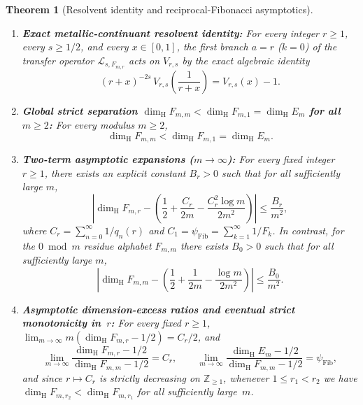 \documentclass[11pt]{article}
\newtheorem{theorem}{Theorem}
\theoremstyle{definition}
\theoremstyle{remark}
\newcommand{\Z}{\mathbb{Z}}
\newcommand{\dimH}{\dim_{\mathrm{H}}}
\begin{document}
\begin{theorem}[Resolvent identity and reciprocal-Fibonacci asymptotics]\label{thm:residues-asymptotic}
\begin{enumerate}[label=(\roman*),leftmargin=2.2em]
\item \textbf{Exact metallic-continuant resolvent identity:}
For every integer $r\ge1$, every $s\ge1/2$, and every $x\in[0,1]$, the first
branch $a=r$ ($k=0$) of the transfer operator $\mathcal L_{s,F_{m,r}}$ acts on
$V_{r,s}$ by the exact algebraic identity
\begin{equation}\label{eq:resolvent-branch}
(r+x)^{-2s}\,V_{r,s}\!\left(\frac{1}{r+x}\right)
=V_{r,s}(x)-1.
\end{equation}
\item \textbf{Global strict separation $\dimH F_{m,m}<\dimH F_{m,1}=\dimH E_m$ for all $m\ge2$:}
For every modulus $m\ge2$,
\begin{equation}\label{eq:global-strict-sep}
\dimH F_{m,m}
<\dimH F_{m,1}
=\dimH E_m.
\end{equation}
\item \textbf{Two-term asymptotic expansions ($m\to\infty$):}
For every fixed integer $r\ge1$, there exists an explicit constant $B_r>0$ such
that for all sufficiently large $m$,
\begin{equation}\label{eq:dimH-Fmr-two-term}
\left|\dimH F_{m,r}-\left(\frac12+\frac{C_r}{2m}-\frac{C_r^2\log m}{2m^2}\right)\right|
\le\frac{B_r}{m^2},
\end{equation}
where $C_r=\sum_{n=0}^\infty 1/q_n(r)$ and $C_1=\psi_{\mathrm{Fib}}=\sum_{k=1}^\infty 1/F_k$.
In contrast, for the $0\bmod m$ residue alphabet $F_{m,m}$ there exists $B_0>0$
such that for all sufficiently large $m$,
\begin{equation}\label{eq:dimH-Fmm-two-term}
\left|\dimH F_{m,m}-\left(\frac12+\frac{1}{2m}-\frac{\log m}{2m^2}\right)\right|
\le\frac{B_0}{m^2}.
\end{equation}
\item \textbf{Asymptotic dimension-excess ratios and eventual strict monotonicity in~$r$:}
For every fixed $r\ge1$, $\lim_{m\to\infty}m(\dimH F_{m,r}-1/2)=C_r/2$, and
\[
\lim_{m\to\infty}\frac{\dimH F_{m,r}-1/2}{\dimH F_{m,m}-1/2}=C_r,\qquad
\lim_{m\to\infty}\frac{\dimH E_m-1/2}{\dimH F_{m,m}-1/2}=\psi_{\mathrm{Fib}},
\]
and since $r\mapsto C_r$ is strictly decreasing on $\Z_{\ge1}$, whenever
$1\le r_1<r_2$ we have $\dimH F_{m,r_2}<\dimH F_{m,r_1}$ for all sufficiently
large~$m$.
\end{enumerate}
\end{theorem}
\end{document}
